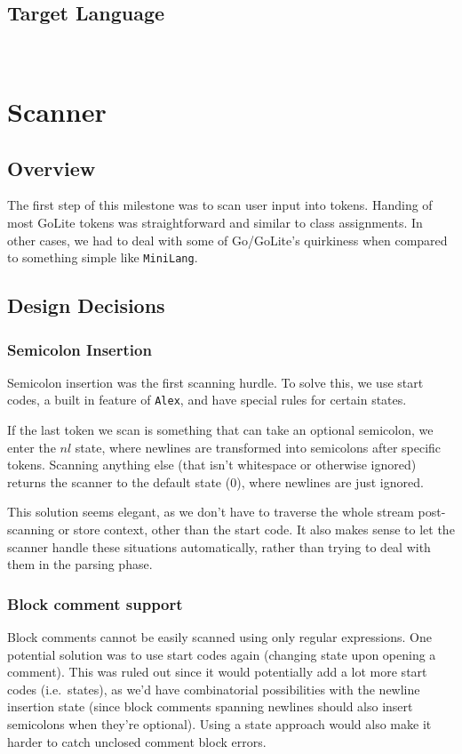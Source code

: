 \documentclass[11pt]{article}
\begin{document}
\subsection{Target Language}~%
\section{Scanner}
\subsection{Overview}
The first step of this milestone was to scan user input into
tokens. Handing of most GoLite tokens was straightforward and
similar to class assignments. In other cases, we had to deal with
some of Go/GoLite's quirkiness when compared to something simple
like \texttt{MiniLang}.

\subsection{Design Decisions}
\subsubsection{Semicolon Insertion}
Semicolon insertion was the first scanning hurdle. To solve
this, we use start codes, a built in feature of \texttt{Alex}, and have
special rules for certain states.

If the last token we scan is something that can take an optional
semicolon, we enter the \(nl\) state, where newlines are transformed into
semicolons after specific tokens. Scanning anything else (that isn't
whitespace or otherwise ignored) returns the scanner to the default
state (\(0\)), where newlines are just ignored.

This solution seems elegant, as we don't have to traverse
the whole stream post-scanning or store context, other than the
start code. It also makes sense to let the scanner handle these
situations automatically, rather than trying to deal with them
in the parsing phase.
\subsubsection{Block comment support}
Block comments cannot be easily scanned using only regular
expressions. One potential solution was to use start codes again
(changing state upon opening a comment). This was ruled out since
it would potentially add a lot more start codes (i.e.\ states), as
we'd have combinatorial possibilities with the newline insertion state
(since block comments spanning newlines should also insert semicolons
when they're optional). Using a state approach would also make it
harder to catch unclosed comment block errors.
\end{document}
